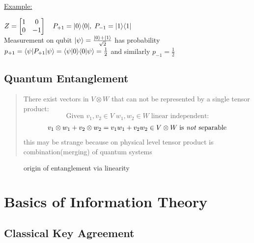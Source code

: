 			\quad\underline{Example:}\\
			\begin{center}
				$ Z = \begin{bmatrix} 1 & 0 \\ 0 & -1 \end{bmatrix} \quad P_{+1} = |0\rangle\langle 0| , \; P_{-1} = |1\rangle\langle 1|	 $\\
				Measurement on qubit $ |\psi \rangle = \frac{|0 \rangle + |1 \rangle}{\sqrt{2}} $ has probability $p_{+1} = \langle \psi|P_{+1}|\psi \rangle = \langle\psi|0\rangle\langle0|\psi\rangle = \frac{1}{2}$ and similarly $p_{-1} = \frac{1}{2}$
			\end{center}%

		\subsection{Quantum Entanglement}
		\begin{quotation}
		There exist vectors in $V\otimes W$ that can not be represented by a single tensor product:
		$$ \textrm{Given } v_1,v_2\in V \; w_1,w_2\in W \; \textrm{linear independent:}$$
		$$v_1\otimes w_1 + v_2\otimes w_2 = v_1w_1 + v_2w_2 \in V\otimes W \; \textrm{is \emph{not} separable}$$ 
		this may be strange because on physical level tensor product is combination(merging) of quantum systems
		\cite{Han13}
		\end{quotation}
		
		\begin{figure}[h]
			\centering
			
			\caption{origin of entanglement via linearity}
		\end{figure}
		
	\section{Basics of Information Theory}
		\subsection{Classical Key Agreement}
